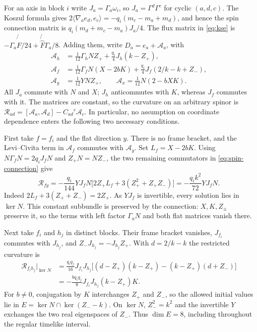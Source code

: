 For an axis in block $i$ write $J_a=\Gamma_a\omega_i$, so
$J_a=\Gamma^d\Gamma^c$ for cyclic $(a,d,c)$. The Koszul formula gives
$2\langle\nabla_a e_d,e_c\rangle=-q_i(m_c-m_a+m_d)$, and hence the spin
connection matrix is $q_i(m_d+m_c-m_a)J_a/4$. The flux matrix in
\eqref{eq:kse} is $-\Gamma_a\not{\hat F}/24+\not{\hat F}\Gamma_a/8$.
Adding them, write $D_a=e_a+\mathcal A_a$, with
\begin{equation}\label{eq:spin-connection}
\begin{aligned}
 \mathcal A_h&=\tfrac1{12}\Gamma_h NZ_+
                 +\tfrac{q_i}{4}J_h(k-Z_+),\\
 \mathcal A_f&=\tfrac1{12}\Gamma_f N(X-2bK)
                 +\tfrac{q_i}{4}J_f(2/k-k+Z_-),\\
 \mathcal A_y&=\tfrac1{12}YNZ_+,\qquad
 \mathcal A_x=\tfrac1{12}N(2-bXK).
\end{aligned}
\end{equation}
All $J_a$ commute with $N$ and $X$; $J_h$ anticommutes with $K$,
whereas $J_f$ commutes with it. The matrices are constant, so the curvature
on an arbitrary spinor is $\mathcal R_{ad}=[\mathcal A_a,\mathcal A_d]
-C_{ad}{}^c\mathcal A_c$. In particular, no assumption on coordinate
dependence enters the following two necessary conditions.

First take $f=f_i$ and the flat direction $y$. There is no frame bracket,
and the Levi--Civita term in $\mathcal A_f$ commutes with $\mathcal A_y$.
Set $L_f=X-2bK$. Using $N\Gamma_fN=2q_iJ_f N$ and $Z_+N=NZ_-$,
the two remaining commutators in \eqref{eq:spin-connection} give
\begin{equation}\label{eq:spin-fy}
 \mathcal R_{fy}=-\frac{q_i}{144}YJ_f N
 \big[2Z_+L_f+3(Z_+^2+Z_+Z_-)\big]
 =-\frac{q_i k^2}{72}YJ_f N .
\end{equation}
Indeed $2L_f+3(Z_++Z_-)=2Z_+$. As $YJ_f$ is invertible, every solution
lies in $\ker N$. This constant subbundle is preserved by the connection:
$X,K,Z_\pm$ preserve it, so the terms with left factor $\Gamma_a N$ and
both flat matrices vanish there.

Next take $f_i$ and $h_j$ in distinct blocks. Their frame bracket vanishes,
$J_{f_i}$ commutes with $J_{h_j}$, and $Z_-J_{h_j}=-J_{h_j}Z_+$.
With $d=2/k-k$ the restricted curvature is
\begin{equation}\label{eq:spin-fh}
\begin{aligned}
 \mathcal R_{f_i h_j}\big|_{\ker N}
 &=\frac{q_iq_j}{16}J_{f_i}J_{h_j}
   \big[(d-Z_+)(k-Z_+)-(k-Z_+)(d+Z_-)\big]\\
 &=-\frac{bq_iq_j}{8}J_{f_i}J_{h_j}(k-Z_+)K .
\end{aligned}
\end{equation}
For $b\ne0$, conjugation by $K$ interchanges $Z_+$ and $Z_-$, so the
allowed initial values lie in $E=\ker N\cap\ker(Z_--k)$. On $\ker N$,
$Z_-^2=k^2$ and the invertible $Y$ exchanges the two real eigenspaces of
$Z_-$. Thus $\dim E=8$, including throughout the regular timelike interval.

